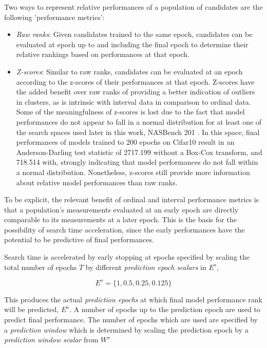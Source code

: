 \documentclass[twocolumn]{article}
\begin{document}
Two ways to represent relative performances of a population of candidates are the following 'performance metrics':
\begin{itemize}
    \item \emph{Raw ranks}: Given candidates trained to the same epoch, 
        candidates can be evaluated at epoch up to and including the final epoch to determine their relative rankings based on performances at that epoch.
    \item \emph{Z-scores}: Similar to raw ranks, candidates can be evaluated at an epoch according to the z-scores of their performances at that epoch.
        Z-scores have the added benefit over raw ranks of providing a better indication of outliers in clusters, as is intrinsic with interval data 
        in comparison to ordinal data.
        Some of the meaningfulness of z-scores is lost due to the fact that model performances do not appear to fall in a normal distribution for at least one of the 
        search spaces used later in this work, NASBench 201 \cite{nasbench201}.
        In this space, final performances of models trained to 200 epochs on Cifar10 result in an Anderson-Darling test statistic of 2717.199 without a 
        Box-Cox transform, and 718.514 with, strongly indicating that model performances do not fall within a normal distribution.
        Nonetheless, z-scores still provide more information about relative model performances than raw ranks.

\end{itemize}

To be explicit, the relevant benefit of ordinal and interval performance metrics is that a population's measurements evaluated at an early epoch are 
directly comparable to its measurements at a later epoch. 
This is the basis for the possibility of search time acceleration, since the early performances have the potential to be predictive of final performances.

Search time is accelerated by early stopping at epochs specified by scaling the total number of epochs $T$ by different \emph{prediction epoch scalars} in $E^s$,

\[E^s = \{1, 0.5, 0.25, 0.125\}\]

This produces the actual \emph{prediction epochs} at which final model performance rank will be predicted, $E^{a}$.
A number of epochs up to the prediction epoch are used to predict final performance. 
The number of epochs which are used are specified by a \emph{prediction window} which is determined by scaling the prediction epoch
by a \emph{prediction window scalar} from $W^s$
\end{document}
